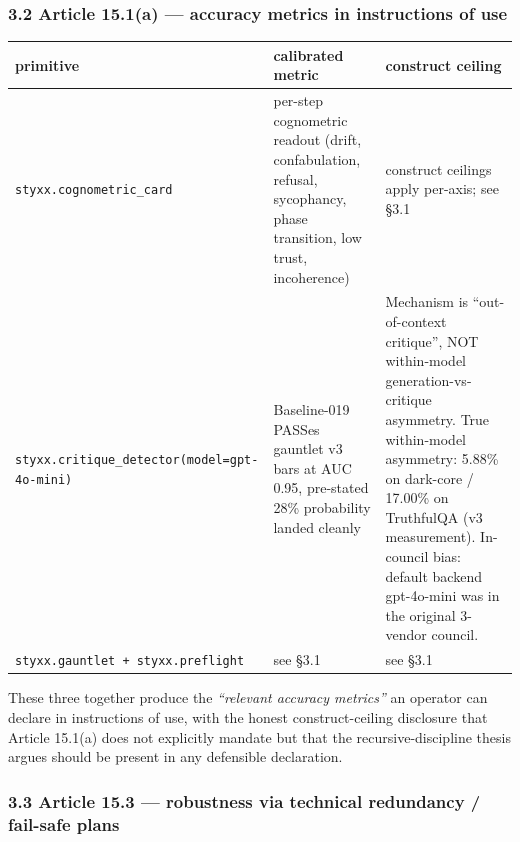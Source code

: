 \documentclass[
]{article}
\newcounter{none} %
\begin{document}
\subsubsection{3.2 Article 15.1(a) --- accuracy metrics in instructions
of use}\label{article-15.1a-accuracy-metrics-in-instructions-of-use}

{\def\LTcaptype{none} %
\begin{longtable}[]{@{}
  >{\raggedright\arraybackslash}p{}
  >{\raggedright\arraybackslash}p{}
  >{\raggedright\arraybackslash}p{}@{}}
\toprule\noalign{}
\begin{minipage}[b]{\linewidth}\raggedright
primitive
\end{minipage} & \begin{minipage}[b]{\linewidth}\raggedright
calibrated metric
\end{minipage} & \begin{minipage}[b]{\linewidth}\raggedright
construct ceiling
\end{minipage} \\
\midrule\noalign{}
\endhead
\bottomrule\noalign{}
\endlastfoot
\texttt{styxx.cognometric\_card} & per-step cognometric readout (drift,
confabulation, refusal, sycophancy, phase transition, low trust,
incoherence) & construct ceilings apply per-axis; see §3.1 \\
\texttt{styxx.critique\_detector(model=\textquotesingle{}gpt-4o-mini\textquotesingle{})}
& Baseline-019 PASSes gauntlet v3 bars at AUC 0.95, pre-stated 28\%
probability landed cleanly & Mechanism is ``out-of-context critique'',
NOT within-model generation-vs-critique asymmetry. True within-model
asymmetry: 5.88\% on dark-core / 17.00\% on TruthfulQA (v3 measurement).
In-council bias: default backend gpt-4o-mini was in the original
3-vendor council. \\
\texttt{styxx.gauntlet\ +\ styxx.preflight} & see §3.1 & see §3.1 \\
\end{longtable}
}

These three together produce the \emph{``relevant accuracy metrics''} an
operator can declare in instructions of use, with the honest
construct-ceiling disclosure that Article 15.1(a) does not explicitly
mandate but that the recursive-discipline thesis argues should be
present in any defensible declaration.

\subsubsection{3.3 Article 15.3 --- robustness via technical redundancy
/ fail-safe
plans}\label{article-15.3-robustness-via-technical-redundancy-fail-safe-plans}
\end{document}
